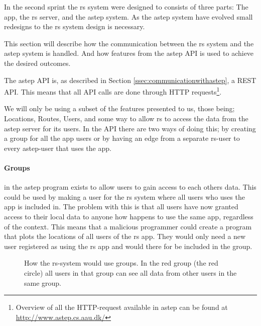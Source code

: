 In the second sprint the \gls{rs} system were designed to consists of three parts: The app, the \gls{rs} server, and the \gls{astep} system.
As the \gls{astep} system have evolved small redesigns to the \gls{rs} system design is necessary.

This section will describe how the communication between the \gls{rs} system and the \gls{astep} system is handled.
And how features from the \gls{astep} API is used to achieve the desired outcomes.

The \gls{astep} API is, as described in Section \ref{ssec:communicationwithastep}, a REST API. 
This means that all API calls are done through HTTP requests\footnote{Overview of all the HTTP-request available in \gls{astep} can be found at \url{http://www.astep.cs.aau.dk/}}.

We will only be using a subset of the features presented to us, those being; Locations, Routes, Users, and some way to allow \gls{rs} to access the data from the \gls{astep} server for its users.
In the API there are two ways of doing this; by creating a group for all the app users or by having an edge from a separate \gls{rs}-user to every \gls{astep}-user that uses the app.

\paragraph{Groups} in the \gls{astep} program exists to allow users to gain access to each others data.
This could be used by making a user for the \gls{rs} system where all users who uses the app is included in.
The problem with this is that all users have now granted access to their local data to anyone how happens to use the same app, regardless of the context. 
This means that a malicious programmer could create a program that plots the locations of all users of the \gls{rs} app.
They would only need a new user registered as using the \gls{rs} app and would there for be included in the group.

\begin{figure}[h]
	\centering
	\label{fig:astepgroup}
	\caption{How the \gls{rs}-system would use groups. In the red group (the red circle) all users in that group can see all data from other users in the same group.}
\end{figure}

